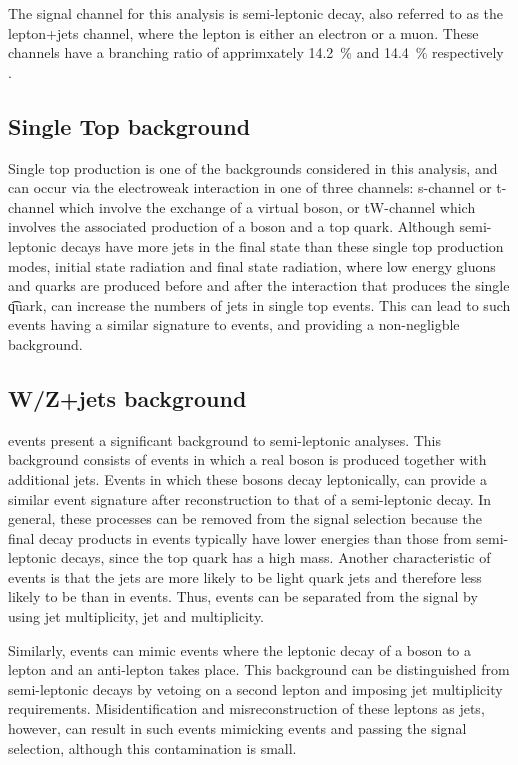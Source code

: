 The signal channel for this analysis is semi-leptonic \ttbar decay, also referred to as the lepton+jets
channel, where the lepton is either an electron or a muon. These channels have a branching ratio of
apprimxately 14.2~\% and 14.4~\% respectively \cite{Agashe:2014kda}.

\subsection{Single Top background}
\label{ss:single_top}
Single top production is one of the backgrounds considered in this analysis, and can occur via the electroweak
interaction in one of three channels: s-channel or t-channel which involve the exchange of a virtual \W boson,
or tW-channel which involves the associated production of a \W boson and a top quark. Although semi-leptonic
\ttbar decays have more jets in the final state than these single top production modes, initial state
radiation and final state radiation, where low energy gluons and quarks are produced before and after the
interaction that produces the single \t quark, can increase the numbers of jets in single top events. This can
lead to such events having a similar signature to \ttbar events, and providing a non-negligble background.

\subsection{W/Z+jets background}
\label{ss:w_z_plus_jets}
\WpJets events present a significant background to semi-leptonic \ttbar analyses. This background consists of
events in which a real \W boson is produced together with additional jets. Events in which these \W bosons
decay leptonically, can provide a similar event signature after reconstruction to that of a semi-leptonic
\ttbar decay. In general, these processes can be removed from the signal selection because the final decay
products in \WpJets events typically have lower energies than those from semi-leptonic \ttbar decays, since
the top quark has a high mass. Another characteristic of \WpJets events is that the jets are more likely to be
light quark jets and therefore less likely to be \bjets than in \ttbar events. Thus, \WpJets events can be
separated from the \ttbar signal by using jet multiplicity, jet \pt and \bjet multiplicity.

Similarly, \ZpJets events can mimic \ttbar events where the leptonic decay of a \Z boson to a lepton and an
anti-lepton takes place. This background can be distinguished from semi-leptonic \ttbar decays by
vetoing on a second lepton and imposing jet multiplicity requirements. Misidentification and misreconstruction
of these leptons as jets, however, can result in such events mimicking \ttbar events and passing the signal
selection, although this contamination is small.

